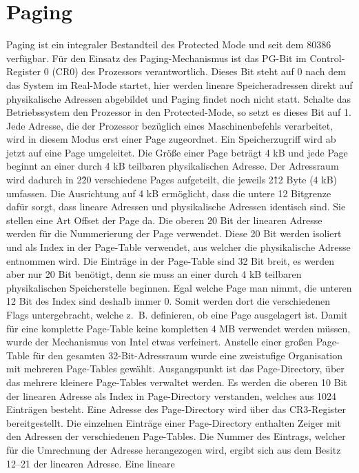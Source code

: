 \documentclass[12pt]{book}
\begin{document}
\section{Paging}
Paging ist ein integraler Bestandteil des Protected Mode und seit dem 80386
verfügbar. Für den Einsatz des Paging-Mechanismus ist das PG-Bit im
Control-Register 0 (CR0) des Prozessors verantwortlich. Dieses Bit steht auf 0
nach dem das System im Real-Mode startet, hier werden lineare Speicheradressen
direkt auf physikalische Adressen abgebildet und Paging findet noch nicht statt.
Schalte das Betriebssystem den Prozessor in den Protected-Mode, so setzt es
dieses Bit auf 1. Jede Adresse, die der Prozessor bezüglich eines
Maschinenbefehls verarbeitet, wird in diesem Modus erst einer Page zugeordnet.
Ein Speicherzugriff wird ab jetzt auf eine Page umgeleitet. Die Größe einer Page
beträgt 4 kB und jede Page beginnt an einer durch 4 kB teilbaren physikalischen
Adresse. Der Adressraum wird dadurch in 2\^20 verschiedene Pages aufgeteilt, die
jeweils 2\^12 Byte (4 kB) umfassen. Die Ausrichtung auf 4 kB ermöglicht, dass die
untere 12 Bitgrenze dafür sorgt, dass lineare Adressen und physikalische
Adressen identisch sind. Sie stellen eine Art Offset der Page da. Die oberen 20
Bit der linearen Adresse werden für die Nummerierung der Page verwendet. Diese
20 Bit werden isoliert und als Index in der Page-Table verwendet, aus welcher
die physikalische Adresse entnommen wird. Die Einträge in der Page-Table sind 32
Bit breit, es werden aber nur 20 Bit benötigt, denn sie muss an einer durch 4 kB
teilbaren physikalischen Speicherstelle beginnen. Egal welche Page man nimmt,
die unteren 12 Bit des Index sind deshalb immer 0. Somit werden dort die
verschiedenen Flags untergebracht, welche z. B. definieren, ob eine Page
ausgelagert ist. Damit für eine komplette Page-Table keine kompletten 4 MB
verwendet werden müssen, wurde der Mechanismus von Intel etwas verfeinert.
Anstelle einer großen Page-Table für den gesamten 32-Bit-Adressraum wurde eine
zweistufige Organisation mit mehreren Page-Tables gewählt. Ausgangspunkt ist das
Page-Directory, über das mehrere kleinere Page-Tables verwaltet werden. Es
werden die oberen 10 Bit der linearen Adresse als Index in Page-Directory
verstanden, welches aus 1024 Einträgen besteht. Eine Adresse des Page-Directory
wird über das CR3-Register bereitgestellt. Die einzelnen Einträge einer
Page-Directory enthalten Zeiger mit den Adressen der verschiedenen Page-Tables.
Die Nummer des Eintrags, welcher für die Umrechnung der Adresse herangezogen
wird, ergibt sich aus dem Besitz 12–21 der linearen Adresse. Eine lineare
\end{document}
